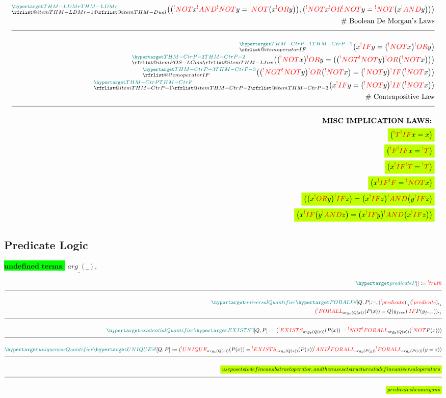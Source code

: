 \documentclass[a4paper]{article}
\makeatletter
\def\ml{\mleft}
\def\mr{\mright}
\newcommand{\tdb}[1]{\colorbox{lime}{$\displaystyle #1$}}
\newcommand{\defeq}{:=}
\newcommand{\eq}{=}
\newcommand{\cusand}{,}
\newcommand{\cuspop}[2]{arg_{#1}(#2)}
\newcommand{\cusend}{.}
\newcommand{\free}[1]{{#1}_{free}}
\newcommand{\cusnum}[2]{{#1}_{{\phantom{ }}_{#2}}}
\newcommand{\eqComment}[1]{\text{  \# #1}}
\newcommand{\n}{\\[1.5ex] \hline \nonumber \\[0ex]}
\newcommand{\m}{\nonumber \\}
\newcommand\rfrlist[1]{%
    \forcsvlist{\rfrlist@item}{#1}
}
\newcommand\rfrlist@item[1]{\rfr{#1}\\}
\newcommand{\thmlink}[2]{{}_{\substack{\rfrlist{#1}}}^{\dfn{#2}} }
\makeatother
\begin{document}
\begin{tcolorbox}
\begin{align}
\m \thmlink{THM-LDMr-14, THM-Dual}{THM-LDMr} \ml(\ml(\rfr{NOT} x \rfr{AND} \rfr{NOT} y \eq \rfr{NOT} \ml(x \rfr{OR} y\mr)\mr) \cusand \ml(\rfr{NOT} x \rfr{OR} \rfr{NOT} y \eq \rfr{NOT} \ml(x \rfr{AND} y\mr)\mr)\mr) 
\m \eqComment{Boolean De Morgan's Laws}
    \n \thmlink{operatorIF}{THM-CtrP-1} \ml(x \rfr{IF} y \eq \ml(\rfr{NOT} x\mr) \rfr{OR} y\mr)  
\m \thmlink{POS-LCom, THM-LInv}{THM-CtrP-2} \ml(\ml(\rfr{NOT} x\mr) \rfr{OR} y \eq \ml(\ml(\rfr{NOT} \rfr{NOT} y\mr) \rfr{OR} \ml(\rfr{NOT} x\mr)\mr)\mr)  
\m \thmlink{operatorIF}{THM-CtrP-3} \ml(\ml(\rfr{NOT} \rfr{NOT} y\mr) \rfr{OR} \ml(\rfr{NOT} x\mr) \eq \ml(\rfr{NOT} y\mr) \rfr{IF} \ml(\rfr{NOT} x\mr)\mr)  
\m \thmlink{THM-CtrP-1, THM-CtrP-2, THM-CtrP-3}{THM-CtrP} \ml(x \rfr{IF} y \eq \ml(\rfr{NOT} y\mr) \rfr{IF} \ml(\rfr{NOT} x\mr)\mr) 
\m \eqComment{Contrapositive Law} 
    \n \textbf{MISC IMPLICATION LAWS: } %
\m \tdb{\ml(\rfr{T} \rfr{IF} x \eq x\mr)}
\m \tdb{\ml(\rfr{F} \rfr{IF} x \eq \rfr{T}\mr)}
\m \tdb{\ml(x \rfr{IF} \rfr{T} \eq \rfr{T}\mr)}
\m \tdb{\ml(x \rfr{IF} \rfr{F} \eq \rfr{NOT} x\mr)}  
\m \tdb{\ml(\ml(x \rfr{OR} y\mr) \rfr{IF} z\mr) \eq \ml(x \rfr{IF} z\mr) \rfr{AND} \ml(y \rfr{IF} z\mr)}
\m \tdb{\ml(x \rfr{IF} \ml(y \rfr{AND} z\mr) \eq \ml(x \rfr{IF} y\mr) \rfr{AND} \ml(x \rfr{IF} z\mr)\mr)} 
\end{align}
\end{tcolorbox}


\subsection{Predicate Logic}
\tdb{\textbf{undefined terms}:} $%
   \cuspop{\_}{\_}, %
$
\begin{tcolorbox}
\begin{align}
    \dfn{predicate} [P][] \defeq \rfr{truth} [P(\free{v})][] 
    \n \dfn{universalQuantifier} [\dfn{FORALL}[\forall]][Q, P] \cusnum{\defeq}{1} (\rfr{predicate} [Q][]) \cusnum{\cusand}{1} (\rfr{predicate} [P][]) \cusnum{\cusand}{1} 
\m (\rfr{FORALL}_{\cuspop{x}{Q(x)}} (P(x)) \eq Q(\free{y}) \rfr{IF} P(\free{y})) \cusnum{\cusend}{1}
    \n \dfn{existentialQuantifier} [\dfn{EXISTS}[\exists]][Q, P] \defeq (\rfr{EXISTS}_{\cuspop{x}{Q(x)}} (P(x)) \eq \rfr{NOT} \rfr{FORALL}_{\cuspop{x}{Q(x)}} (\rfr{NOT} P(x)))
    \n \dfn{uniquenessQuantifier} [\dfn{UNIQUE}[\exists!]][Q, P] \defeq (\rfr{UNIQUE}_{\cuspop{x}{Q(x)}} (P(x)) \eq \rfr{EXISTS}_{\cuspop{x}{Q(x)}} (P(x)) \rfr{AND} \rfr{FORALL}_{\cuspop{y}{P(y)}} \rfr{FORALL}_{\cuspop{z}{P(z)}} (y = z))
    \n \tdb{use posets to define an abstract operator, and then use set structures to define universal operators}
    \n \tdb{predicate shenanigans}
\end{align}
\end{tcolorbox}
\end{document}
